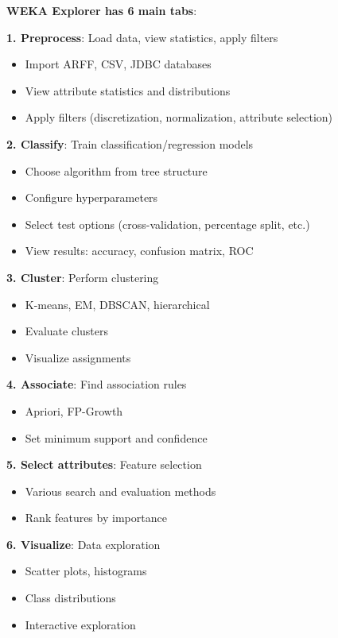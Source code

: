 \documentclass[11pt,twoside]{article}
\numberwithin{equation}{section}
\theoremstyle{plain}
\theoremstyle{definition}
\theoremstyle{remark}
\newenvironment{keyidea}{
  \begin{tcolorbox}[colback=yellow!5!white,
                    colframe=yellow!50!black,
                    title=Key Idea,
                    breakable,
                    enhanced,
                    sharp corners,
                    boxrule=0.8pt,
                    left=6pt, right=6pt, top=6pt, bottom=6pt]
}{
  \end{tcolorbox}
}
\begin{document}
\begin{keyidea}
\textbf{WEKA Explorer has 6 main tabs}:

\textbf{1. Preprocess}: Load data, view statistics, apply filters
\begin{itemize}
\item Import ARFF, CSV, JDBC databases
\item View attribute statistics and distributions
\item Apply filters (discretization, normalization, attribute selection)
\end{itemize}

\textbf{2. Classify}: Train classification/regression models
\begin{itemize}
\item Choose algorithm from tree structure
\item Configure hyperparameters
\item Select test options (cross-validation, percentage split, etc.)
\item View results: accuracy, confusion matrix, ROC
\end{itemize}

\textbf{3. Cluster}: Perform clustering
\begin{itemize}
\item K-means, EM, DBSCAN, hierarchical
\item Evaluate clusters
\item Visualize assignments
\end{itemize}

\textbf{4. Associate}: Find association rules
\begin{itemize}
\item Apriori, FP-Growth
\item Set minimum support and confidence
\end{itemize}

\textbf{5. Select attributes}: Feature selection
\begin{itemize}
\item Various search and evaluation methods
\item Rank features by importance
\end{itemize}

\textbf{6. Visualize}: Data exploration
\begin{itemize}
\item Scatter plots, histograms
\item Class distributions
\item Interactive exploration
\end{itemize}
\end{keyidea}
\end{document}
